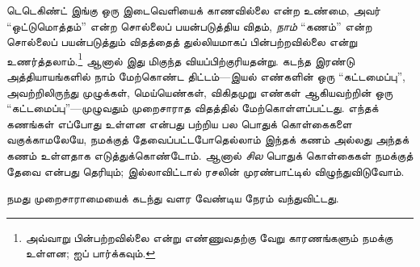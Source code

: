 \documentclass[../../../include/open-logic-section]{subfiles}
\begin{document}
டெடெகிண்ட் இங்கு ஒரு இடைவெளியைக் காணவில்லை என்ற உண்மை, அவர்
``ஒட்டுமொத்தம்'' என்ற சொல்லைப் பயன்படுத்திய விதம், \emph{நாம்} ``கணம்'' என்ற
சொல்லைப் பயன்படுத்தும் விதத்தைத் துல்லியமாகப் பின்பற்றவில்லை என்று
உணர்த்தலாம்.\footnote{அவ்வாறு பின்பற்றவில்லை என்று எண்ணுவதற்கு வேறு
காரணங்களும் நமக்கு உள்ளன; \citet[p.~23]{Potter2004} ஐப் பார்க்கவும்.}
ஆனால் இது மிகுந்த வியப்பிற்குரியதன்று. கடந்த இரண்டு அத்தியாயங்களில்
நாம் மேற்கொண்ட திட்டம்---இயல் எண்களின் ஒரு ``கட்டமைப்பு'', அவற்றிலிருந்து
முழுக்கள், மெய்யெண்கள், விகிதமுறு எண்கள் ஆகியவற்றின் ஒரு
``கட்டமைப்பு''---முழுவதும் முறைசாராத விதத்தில் மேற்கொள்ளப்பட்டது.
எந்தக் கணங்கள் எப்போது உள்ளன என்பது பற்றிய பல பொதுக் கொள்கைகளை
வகுக்காமலேயே, நமக்குத் தேவைப்பட்டபோதெல்லாம் இந்தக் கணம் அல்லது அந்தக்
கணம் உள்ளதாக எடுத்துக்கொண்டோம். ஆனால் \emph{சில} பொதுக் கொள்கைகள்
நமக்குத் தேவை என்பது தெரியும்; இல்லாவிட்டால் ரசலின் முரண்பாட்டில்
விழுந்துவிடுவோம்.

நமது முறைசாராமையைக் கடந்து வளர வேண்டிய நேரம் வந்துவிட்டது.
\end{document}
